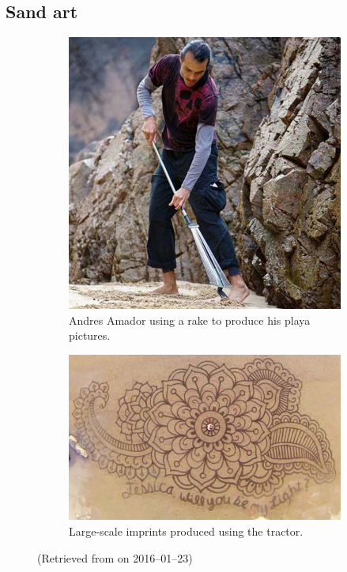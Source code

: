     \subsection{Sand art}\label{sand art}
        \begin{figure}
            \centering
            \begin{subfigure}[b]{0.45\textwidth}
                \includegraphics[width=\textwidth]{Files/andres_amador.jpg}
                \caption{Andres Amador using a rake to produce his playa pictures.}
                \label{fig: andres amador}
            \end{subfigure}
            \begin{subfigure}[b]{0.45\textwidth}
                \includegraphics[width=\textwidth]{Files/andres_amador_art.jpg}
                \caption{Large-scale imprints produced using the tractor.}
                \label{fig: andres amador art}
            \end{subfigure}
            \caption{\small (Retrieved from  on 2016--01--23)}
            \label{fig: andres amador and art}
        \end{figure}
